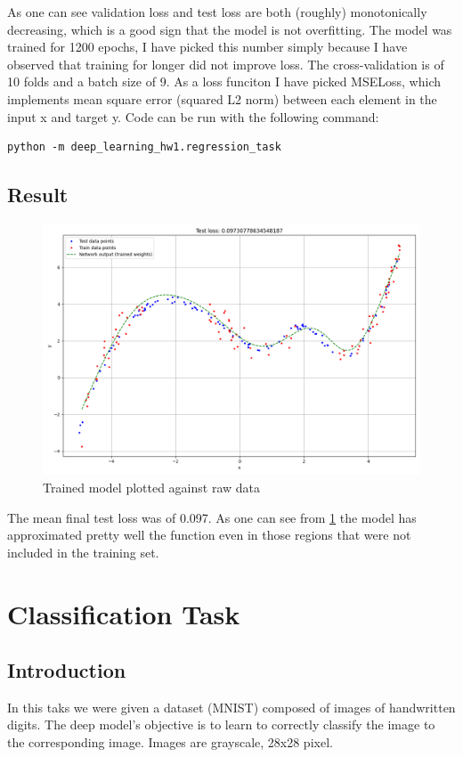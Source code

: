 \documentclass{article}
\begin{document}
As one can see validation loss and test loss are both (roughly) monotonically decreasing, which is a good sign that the model is not overfitting. The model was trained for 1200 epochs, I have picked this number simply because I have observed that training for longer did not improve loss. The cross-validation is of 10 folds and a batch size of 9. As a loss funciton I have picked MSELoss, which implements mean square error (squared L2 norm) between each element in the input x and target y.
Code can be run with the following command:
\begin{lstlisting}
python -m deep_learning_hw1.regression_task
\end{lstlisting}

\subsection{Result}
\begin{figure}[H]
    \includegraphics[width=\linewidth]{regression_task/imgs/model_and_data.png}
    \caption{Trained model plotted against raw data}\label{model_and_data}
\end{figure}
The mean final test loss was of 0.097. As one can see from \figurename{\ref{model_and_data}} the model has approximated pretty well the function even in those regions that were not included in the training set.

\section{Classification Task}
\subsection{Introduction}
In this taks we were given a dataset (MNIST) composed of images of handwritten digits. The deep model's objective is to learn to correctly classify the image to the corresponding image. Images are grayscale, 28x28 pixel.
\end{document}
